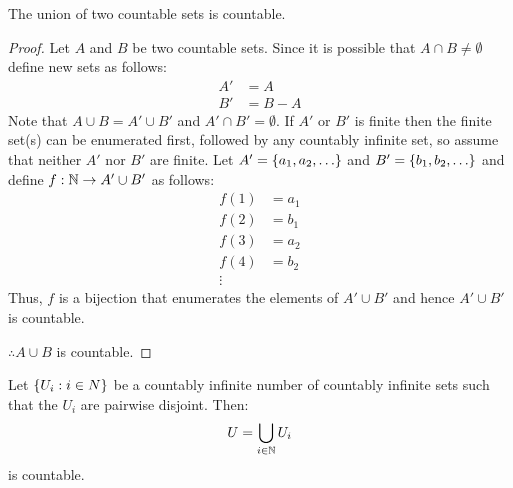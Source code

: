 \documentclass[letterpaper,12pt,fleqn]{article}
\begin{document}
\begin{theorem}
  The union of two countable sets is countable.
\end{theorem}

\begin{proof}
  Let \(A\) and \(B\) be two countable sets.  Since it is possible that \(A\cap B\ne\emptyset\) define new sets as
  follows:
  \begin{align*}
    A' &= A \\
    B' &= B-A
  \end{align*}
  Note that \(A\cup B=A'\cup B'\) and \(A'\cap B'=\emptyset\).  If \(A'\) or \(B'\) is finite then the finite
  set(s) can be enumerated first, followed by any countably infinite set, so assume that neither \(A'\) nor \(B'\)
  are finite.  Let \(A'=\{a_1,a_2,\ldots\}\) and \(B'=\{b_1,b_2,\ldots\}\) and define \(f:\mathbb{N}\to A'\cup B'\) as
  follows:
  \begin{align*}
    f(1) &= a_1 \\
    f(2) &= b_1 \\
    f(3) &= a_2 \\
    f(4) &= b_2 \\
    \vdots
  \end{align*}
  Thus, \(f\) is a bijection that enumerates the elements of \(A'\cup B'\) and hence \(A'\cup B'\) is countable.

  \(\therefore A\cup B\) is countable.
\end{proof}

\begin{lemma}
  Let \(\{U_i:i\in N\}\) be a countably infinite number of countably infinite sets such that the \(U_i\) are
  pairwise disjoint.  Then:
  \[U=\bigcup_{i\in\mathbb{N}}U_i\]
  is countable.
\end{lemma}
\end{document}
